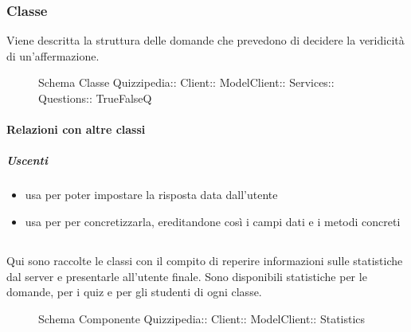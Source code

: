 \subsubsection{Classe }
Viene descritta la struttura delle domande che prevedono di decidere la veridicità di un'affermazione.
\begin{figure}[H]
\centering
\noindent{}
\caption[Schema Classe TrueFalseQ]{Schema Classe Quizzipedia:: Client:: ModelClient:: Services:: Questions:: TrueFalseQ}
\end{figure}
\paragraph{Relazioni con altre classi}
\subparagraph{Uscenti}
\begin{itemize}
\item usa  per poter impostare la risposta data dall'utente
\item usa  per per concretizzarla, ereditandone così i campi dati e i metodi concreti
\end{itemize}
\subsection{}
Qui sono raccolte le classi con il compito di reperire informazioni sulle statistiche dal server e presentarle all'utente finale. Sono disponibili statistiche per le domande, per i quiz e per gli studenti di ogni classe.
\begin{figure}[H]
\centering
\noindent{}
\caption[Schema Componente Statistics]{Schema Componente Quizzipedia:: Client:: ModelClient:: Statistics}
\end{figure}
